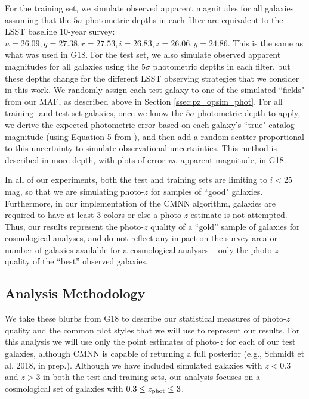 For the training set, we simulate observed apparent magnitudes for all galaxies assuming that the $5{\sigma}$ photometric depths in each filter are equivalent to the LSST baseline 10-year survey: $u=26.09,g=27.38,r=27.53,i=26.83,z=26.06,y=24.86$. This is the same as what was used in G18. For the test set, we also simulate observed apparent magnitudes for all galaxies using the $5{\sigma}$ photometric depths in each filter, but these depths change for the different LSST observing strategies that we consider in this work. We randomly assign each test galaxy to one of the simulated ``fields" from our MAF, as described above in Section \ref{ssec:pz_opsim_phot}. For all training- and test-set galaxies, once we know the $5{\sigma}$ photometric depth to apply, we derive the expected photometric error based on each galaxy's ``true" catalog magnitude (using Equation 5 from \citealt{2008arXiv0805.2366I}), and then add a random scatter proportional to this uncertainty to simulate observational uncertainties. This method is described in more depth, with plots of error {\it vs.} apparent magnitude, in G18.

In all of our experiments, both the test and training sets are limiting to $i<25$ mag, so that we are simulating photo-$z$ for samples of ``good" galaxies. Furthermore, in our implementation of the CMNN algorithm, galaxies are required to have at least 3 colors or else a photo-$z$ estimate is not attempted. Thus, our results represent the photo-$z$ quality of a ``gold'' sample of galaxies for cosmological analyses, and do not reflect any impact on the survey area or number of galaxies available for a cosmological analyses -- only the photo-$z$ quality of the ``best'' observed galaxies.


\subsection{Analysis Methodology}\label{ssec:pz_exp_meth}

We take these blurbs from G18 to describe our statistical measures of photo-$z$ quality and the common plot styles that we will use to represent our results. For this analysis we will use only the point estimates of photo-$z$ for each of our test galaxies, although CMNN is capable of returning a full posterior (e.g., Schmidt et al. 2018, in prep.). Although we have included simulated galaxies with $z<0.3$ and $z>3$ in both the test and training sets, our analysis focuses on a cosmological set of galaxies with $0.3 \leq z_{\rm phot} \leq 3$.

